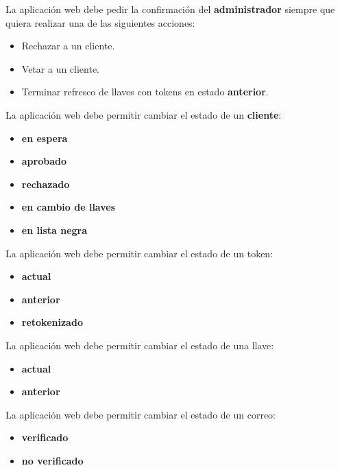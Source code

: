 {
  La aplicación web debe pedir la confirmación del \textbf{administrador}
  siempre que quiera realizar una de las siguientes acciones:
  \begin{itemize}
    \item Rechazar a un cliente.
    \item Vetar a un cliente.
    \item Terminar refresco de llaves con tokens en estado \textbf{anterior}.
  \end{itemize}
}

{
  La aplicación web debe permitir cambiar el estado de un \textbf{cliente}:
  \begin{itemize}
    \item \textbf{en espera}
    \item \textbf{aprobado}
    \item \textbf{rechazado}
    \item \textbf{en cambio de llaves}
    \item \textbf{en lista negra}
  \end{itemize}
}

{
  La aplicación web debe permitir cambiar el estado de un token:
  \begin{itemize}
    \item \textbf{actual}
    \item \textbf{anterior}
    \item \textbf{retokenizado}
  \end{itemize}
}

{
  La aplicación web debe permitir cambiar el estado de una llave:
  \begin{itemize}
    \item \textbf{actual}
    \item \textbf{anterior}
  \end{itemize}
}

{
  La aplicación web debe permitir cambiar el estado de un correo:
  \begin{itemize}
    \item \textbf{verificado}
    \item \textbf{no verificado}
  \end{itemize}
}
